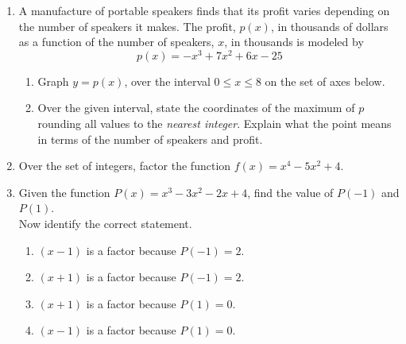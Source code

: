 \documentclass[12pt, twoside]{article}
\begin{document}
\begin{enumerate}[itemsep=0.5cm]
\newpage
\item A manufacture of portable speakers finds that its profit varies depending on the number of speakers it makes. The profit, $p(x)$, in thousands of dollars as a function of the number of speakers, $x$, in thousands is modeled by $$p(x) = -x^3+7x^2+6x-25$$
\begin{enumerate}
    \item Graph $y=p(x)$, over the interval $0 \leq x \leq 8$ on the set of axes below.
    \item Over the given interval, state the coordinates of the maximum of $p$ rounding all values to the \emph{nearest integer}. Explain what the point means in terms of the number of speakers and profit. \vspace{3cm}
\end{enumerate}
\begin{center}
    \end{center}

\newpage
\item Over the set of integers, factor the function $f(x) = x^4-5x^2+4$. \vspace{10cm}

\item Given the function $P(x) = x^3-3x^2-2x+4$, find the value of $P(-1)$ and $P(1)$.\\[5cm]
Now identify the correct statement.
\begin{enumerate}
    \item $(x-1)$ is a factor because $P(-1)=2$.
    \item $(x+1)$ is a factor because $P(-1)=2$.
    \item $(x+1)$ is a factor because $P(1)=0$.
    \item $(x-1)$ is a factor because $P(1)=0$.
\end{enumerate}

\newpage


\end{enumerate}
\end{document}

